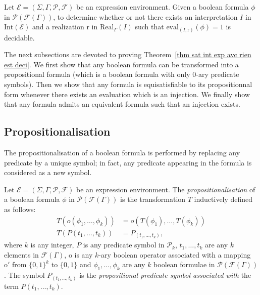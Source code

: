 \documentclass[a4paper]{llncs}
\begin{document}
  \begin{theorem}\label{thm sat int exp avc rien est deci}
     Let $\mathcal{E}=(\Sigma,\Gamma,\mathcal{P},\mathcal{F})$ be an expression environment. Given a boolean formula $\phi$ in $\mathcal{P}(\mathcal{F}(\Gamma))$, to determine whether or not there exists an interpretation $I$ in $\mathrm{Int}(\mathcal{E})$ and a realization $\mathrm{r}$ in $\mathrm{Real}_\Gamma(I)$ such that $\mathrm{eval}_{(I,\mathrm{r})}(\phi)=1$ is decidable.
   \end{theorem} 
   
   The next subsections are devoted to proving Theorem~\ref{thm sat int exp avc rien est deci}. We first show that any boolean formula can be transformed into a propositional formula (which is a boolean formula with only $0$-ary predicate symbols). Then we show that any formula is equisatisfiable to its propositionnal form whenever there exists an evaluation which is an injection. We finally show that any formula admits an equivalent formula such that an injection exists.
   
  \subsection{Propositionalisation}
  
  The propositionalisation of a boolean formula is performed by replacing any predicate by a unique symbol; in fact, any predicate appearing in the formula is considered as a new symbol.
  
  \begin{definition}[Propositionalisation]\label{def propositionalisation}
    Let $\mathcal{E}=(\Sigma,\Gamma,\mathcal{P},\mathcal{F})$ be an expression environment. The \emph{propositionalisation} of a boolean formula $\phi$ in $\mathcal{P}(\mathcal{F}(\Gamma))$ is the transformation $T$ inductively defined as follows:
        \begin{align*}
      T(o(\phi_1,\ldots,\phi_k))&=o(T(\phi_1),\ldots,T(\phi_k))\\
      T(P(t_1,\ldots,t_k))&=P_{(t_1,\ldots,t_k)},
        \end{align*}
        where $k$ is any integer, $P$ is any predicate symbol in $\mathcal{P}_k$, $t_1,\ldots,t_k$ are any $k$ elements in $\mathcal{F}(\Gamma)$, $\mathrm{o}$ is any $k$-ary boolean operator associated with a mapping $\mathrm{o}'$ from $\{0,1\}^k$ to $\{0,1\}$ and $\phi_1,\ldots,\phi_k$ are any $k$ boolean formulae in $\mathcal{P}(\mathcal{F}(\Gamma))$. The symbol $P_{(t_1,\ldots,t_k)}$ is the \emph{propositional predicate symbol associated with} the term $P(t_1,\ldots,t_k)$.
  \end{definition}
    
\end{document}
